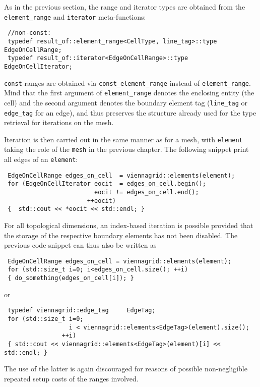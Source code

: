
As in the previous section, the range and iterator types are obtained from the \lstinline|element_range| and \lstinline|iterator| meta-functions:
\begin{lstlisting}
 //non-const:
 typedef result_of::element_range<CellType, line_tag>::type   EdgeOnCellRange;
 typedef result_of::iterator<EdgeOnCellRange>::type           EdgeOnCellIterator;
\end{lstlisting}
\lstinline|const|-ranges are obtained via \lstinline|const_element_range| instead of \lstinline|element_range|.
Mind that the first argument of \lstinline|element_range| denotes the enclosing entity (the cell) and the second argument denotes the boundary element tag (\lstinline|line_tag| or \lstinline|edge_tag| for an edge), and thus preserves the structure already used for the type retrieval for iterations on the mesh.

Iteration is then carried out in the same manner as for a mesh, with \lstinline|element| taking the role of the \lstinline|mesh| in the previous chapter.
The following snippet print all edges of an \lstinline|element|:
\begin{lstlisting}
 EdgeOnCellRange edges_on_cell  = viennagrid::elements(element);
 for (EdgeOnCellIterator eocit  = edges_on_cell.begin();
                         eocit != edges_on_cell.end();
                       ++eocit)
 {  std::cout << *eocit << std::endl; }
\end{lstlisting}

For all topological dimensions, an index-based iteration is possible provided that the storage of the respective boundary elements has not been disabled. The previous code snippet can thus also be written as
\begin{lstlisting}
 EdgeOnCellRange edges_on_cell = viennagrid::elements(element);
 for (std::size_t i=0; i<edges_on_cell.size(); ++i)
 { do_something(edges_on_cell[i]); }
\end{lstlisting}
or
\begin{lstlisting}
 typedef viennagrid::edge_tag     EdgeTag;
 for (std::size_t i=0;
                  i < viennagrid::elements<EdgeTag>(element).size();
                ++i)
 { std::cout << viennagrid::elements<EdgeTag>(element)[i] << std::endl; }
\end{lstlisting}
The use of the latter is again discouraged for reasons of possible non-negligible repeated setup costs of the ranges involved.

